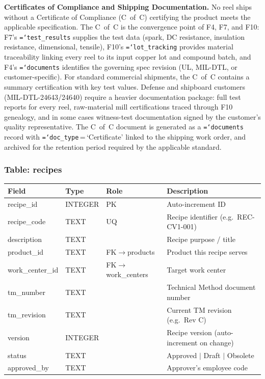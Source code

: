 \documentclass[11pt]{article}
\newcommand{\tfield}[1]{\texttt{\hyphenchar\font=`\-\relax #1}}
\begin{document}
\textbf{Certificates of Compliance and Shipping Documentation.}
No reel ships without a Certificate of Compliance (C~of~C) certifying the product meets the applicable specification.  The C~of~C is the convergence point of F4, F7, and F10: F7's \tfield{test\_results} supplies the test data (spark, DC resistance, insulation resistance, dimensional, tensile), F10's \tfield{lot\_tracking} provides material traceability linking every reel to its input copper lot and compound batch, and F4's \tfield{documents} identifies the governing spec revision (UL, MIL-DTL, or customer-specific).  For standard commercial shipments, the C~of~C contains a summary certification with key test values.  Defense and shipboard customers (MIL-DTL-24643/24640) require a heavier documentation package: full test reports for every reel, raw-material mill certifications traced through F10 genealogy, and in some cases witness-test documentation signed by the customer's quality representative.  The C~of~C document is generated as a \tfield{documents} record with \tfield{doc\_type}\,=\,`Certificate' linked to the shipping work order, and archived for the retention period required by the applicable standard.

\subsubsection*{Table: recipes}
\begin{table}[H]\centering\small
\begin{tabular}{@{} l l l L{5.5cm} @{}}
\toprule
\textbf{Field} & \textbf{Type} & \textbf{Role} & \textbf{Description} \\
\midrule
recipe\_id      & INTEGER & PK  & Auto-increment ID \\
recipe\_code    & TEXT    & UQ  & Recipe identifier (e.g.\ REC-CV1-001) \\
description     & TEXT    &     & Recipe purpose / title \\
product\_id     & TEXT    & FK$\to$products & Product this recipe serves \\
work\_center\_id & TEXT   & FK$\to$work\_centers & Target work center \\
tm\_number      & TEXT    &     & Technical Method document number \\
tm\_revision    & TEXT    &     & Current TM revision (e.g.\ Rev C) \\
version         & INTEGER &     & Recipe version (auto-increment on change) \\
status          & TEXT    &     & Approved $\mid$ Draft $\mid$ Obsolete \\
approved\_by    & TEXT    &     & Approver's employee code \\
\bottomrule
\end{tabular}
\end{table}
\end{document}
